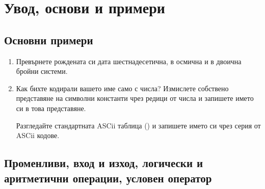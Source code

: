 \clearpage\section {Увод, основи и примери}

\subsection {Основни примери}

\begin{enumerate}

	\item Превърнете рождената си дата шестнадесетична, в осмична и в двоична бройни системи.

	\item Как бихте кодирали вашето име само с числа? Измислете собствено представяне на символни константи чрез редици от числа и запишете името си в това представяне.

	Разгледайте стандартната ASCii таблица () и запишете името си чрез серия от ASCii кодове.

\end{enumerate}

\subsection {Променливи, вход и изход, логически и аритметични операции, условен оператор}

